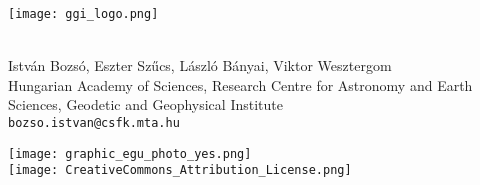 \documentclass[a0, 18pt, landscape]{a0poster}
\begin{document}

\bfseries

\begin{minipage}{0.935\textwidth}
\begin{mdframed}[linecolor=black, linewidth=5pt, innerleftmargin=10pt, innerrightmargin=10pt, innertopmargin=25pt, innerbottommargin=25pt, backgroundcolor=tcol, roundcorner=10pt]
    \begin{minipage}[c]{0.1\textwidth}
        \texttt{[image: ggi\_logo.png]}
    \end{minipage}
    \begin{minipage}[c]{0.9\textwidth}
      \\[35pt] %
      {\Large István Bozsó, Eszter Szűcs, László Bányai, Viktor Wesztergom }\\[20pt]
     {\Large \normalfont Hungarian Academy of Sciences, Research Centre for Astronomy and Earth Sciences, Geodetic and Geophysical Institute}\\[25pt]
    {\Large \texttt{bozso.istvan@csfk.mta.hu}}
    \end{minipage}
\end{mdframed}
\end{minipage}
\hspace{15pt}
\begin{minipage}[c]{0.05\textwidth}
    \begin{center}
        \texttt{[image: graphic\_egu\_photo\_yes.png]}\\[10pt]
        \texttt{[image: CreativeCommons\_Attribution\_License.png]}
    \end{center}
\end{minipage}

\vspace{25pt}


\small
\end{document}
